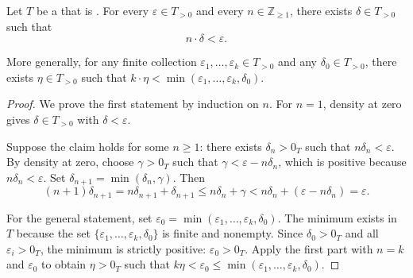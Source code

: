 \begin{proposition} \label{proposition:small_scalar_multiples_in_dense_at_zero_semiring}
Let $T$ be a  that is . For every $\varepsilon \in T_{>0}$ and every $n \in \mathbb{Z}_{\geq 1}$, there exists $\delta \in T_{>0}$ such that
$$n \cdot \delta < \varepsilon.$$

More generally, for any finite collection $\varepsilon_1, \dots, \varepsilon_k \in T_{>0}$ and any $\delta_0 \in T_{>0}$, there exists $\eta \in T_{>0}$ such that $k \cdot \eta < \min(\varepsilon_1, \dots, \varepsilon_k, \delta_0)$.
\end{proposition}

\begin{proof}
We prove the first statement by induction on $n$. For $n = 1$, density at zero gives $\delta \in T_{>0}$ with $\delta < \varepsilon$.

Suppose the claim holds for some $n \geq 1$: there exists $\delta_n > 0_T$ such that $n\delta_n < \varepsilon$. By density at zero, choose $\gamma > 0_T$ such that $\gamma < \varepsilon - n\delta_n$, which is positive because $n\delta_n < \varepsilon$. Set $\delta_{n+1} = \min(\delta_n, \gamma)$. Then
$$(n+1)\delta_{n+1} = n\delta_{n+1} + \delta_{n+1} \leq n\delta_n + \gamma < n\delta_n + (\varepsilon - n\delta_n) = \varepsilon.$$

For the general statement, set $\varepsilon_0 = \min(\varepsilon_1, \dots, \varepsilon_k, \delta_0)$. The minimum exists in $T$ because the set $\{\varepsilon_1, \dots, \varepsilon_k, \delta_0\}$ is finite and nonempty. Since $\delta_0 > 0_T$ and all $\varepsilon_i> 0_T$, the minimum is strictly positive: $\varepsilon_0 > 0_T$. Apply the first part with $n = k$ and $\varepsilon_0$ to obtain $\eta > 0_T$ such that $k\eta < \varepsilon_0 \leq \min(\varepsilon_1, \dots, \varepsilon_k, \delta_0)$.
\end{proof}
